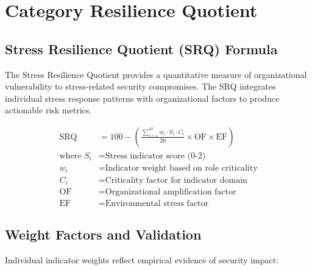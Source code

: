\documentclass[11pt,a4paper]{article}
\begin{document}
\section{Category Resilience Quotient}

\subsection{Stress Resilience Quotient (SRQ) Formula}

The Stress Resilience Quotient provides a quantitative measure of organizational vulnerability to stress-related security compromises. The SRQ integrates individual stress response patterns with organizational factors to produce actionable risk metrics.

\begin{align}
\text{SRQ} &= 100 - \left( \frac{\sum_{i=1}^{10} w_i \cdot S_i \cdot C_i}{20} \times \text{OF} \times \text{EF} \right) \\
\text{where } S_i &= \text{Stress indicator score (0-2)} \\
w_i &= \text{Indicator weight based on role criticality} \\
C_i &= \text{Criticality factor for indicator domain} \\
\text{OF} &= \text{Organizational amplification factor} \\
\text{EF} &= \text{Environmental stress factor}
\end{align}

\subsection{Weight Factors and Validation}

Individual indicator weights reflect empirical evidence of security impact:
\end{document}
